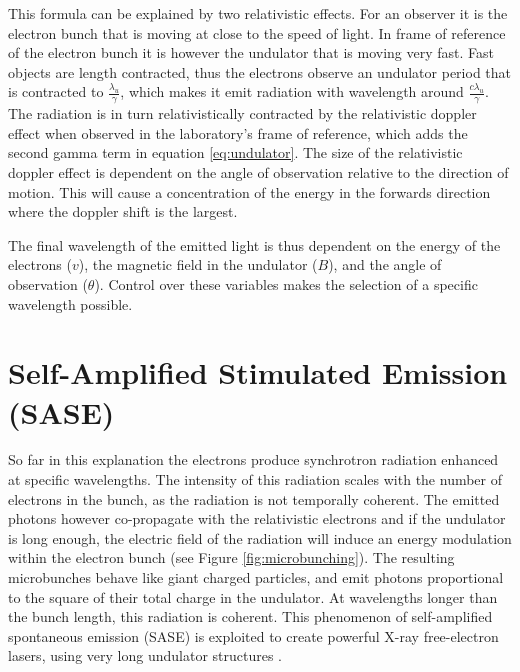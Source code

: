 This formula can be explained by two relativistic effects. For an observer it is the electron bunch that is moving at close to the speed of light. In frame of reference of the electron bunch it is however the undulator that is moving very fast. Fast objects are length contracted, thus the electrons observe an undulator period that is contracted to  $\frac{\lambda_u}{\gamma}$, which makes it emit radiation with wavelength around $\frac{c\lambda_u}{\gamma}$. The radiation is in turn relativistically contracted by the relativistic doppler effect when observed in the laboratory's frame of reference, which adds the second gamma term in equation \ref{eq:undulator}. The size of the relativistic doppler effect is dependent on the angle of observation relative to the direction of motion. This will cause a concentration of the energy in the forwards direction where the doppler shift is the largest.

The final wavelength of the emitted light is thus dependent on the energy of the electrons ($v$), the magnetic field in the undulator ($B$), and the angle of observation ($\theta$). Control over these variables makes the selection of a specific wavelength possible. 

\section{Self-Amplified Stimulated Emission (SASE)}
So far in this explanation the electrons produce synchrotron radiation enhanced at specific wavelengths. The intensity of this radiation scales with the number of electrons in the bunch, as the radiation is not temporally coherent. The emitted photons however co-propagate with the relativistic electrons and if the undulator is long enough, the electric field of the radiation will induce an energy modulation within the electron bunch (see Figure \ref{fig:microbunching}). The resulting microbunches behave like giant charged particles, and emit photons proportional to the square of their total charge in the undulator. At wavelengths longer than the bunch length, this radiation is coherent. This phenomenon of self-amplified spontaneous emission (SASE) is exploited to create powerful X-ray free-electron lasers, using very long undulator structures \cite{Kondratenko1980, Bonifacio1984}. 

